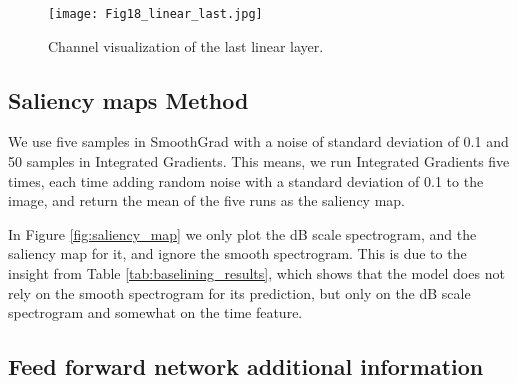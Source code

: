 \documentclass[preprint,NumberedRefs]{JASA}
\begin{document}
\begin{figure}[ht]
        \texttt{[image: Fig18\_linear\_last.jpg]}
        \caption{\label{fig:channel_last linear}{Channel visualization of the last linear layer.}}
        \end{figure}


\FloatBarrier

\subsection{Saliency maps Method}
\label{sec:Additional_saliency_method}
        
We use five samples in SmoothGrad with a noise of standard deviation of 0.1 and 50 samples in Integrated Gradients.
This means, we run Integrated Gradients five times, each time adding random noise with a standard deviation of 0.1 to the image, and return the mean of the five runs as the saliency map.
        
In Figure \ref{fig:saliency_map} we only plot the dB scale spectrogram, and the saliency map for it, and ignore the smooth spectrogram.
This is due to the insight from Table \ref{tab:baselining_results}, which shows that the model does not rely on the smooth spectrogram for its prediction, but only on the dB scale spectrogram and somewhat on the time feature.

\FloatBarrier

\subsection{Feed forward network additional information}
\label{FNN_additional_info}
\end{document}
